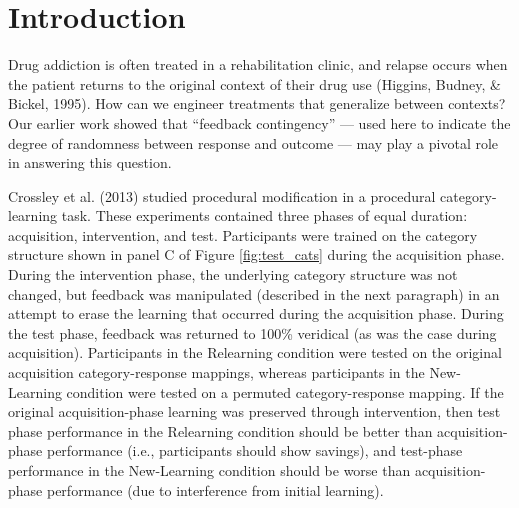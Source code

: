 \section*{Introduction}
Drug addiction is often treated in a rehabilitation clinic, and relapse occurs
when the patient returns to the original context of their drug use (Higgins,
Budney, \& Bickel, 1995). How can we engineer treatments that generalize between
contexts? Our earlier work \cite{crossley_erasing_2013} showed that
``feedback contingency'' --- used here to indicate the degree of randomness
between response and outcome --- may play a pivotal role in answering this
question.

Crossley et al. (2013) studied procedural modification in a procedural category-learning task. These experiments contained three phases of equal duration:
acquisition, intervention, and test. Participants were trained on the category
structure shown in panel C of Figure \ref{fig:test_cats} during the acquisition
phase. During the intervention phase, the underlying category structure was not
changed, but feedback was manipulated (described in the next paragraph) in an
attempt to erase the learning that occurred during the acquisition phase. During
the test phase, feedback was returned to 100\% veridical (as was the case during
acquisition). Participants in the Relearning condition were tested on the
original acquisition category-response mappings, whereas participants in the New-Learning condition were tested on a permuted category-response mapping. If the original
acquisition-phase learning was preserved through intervention, then test phase
performance in the Relearning condition should be better than acquisition-phase
performance (i.e., participants should show savings), and test-phase performance
in the New-Learning condition should be worse than acquisition-phase performance
(due to interference from initial learning).

